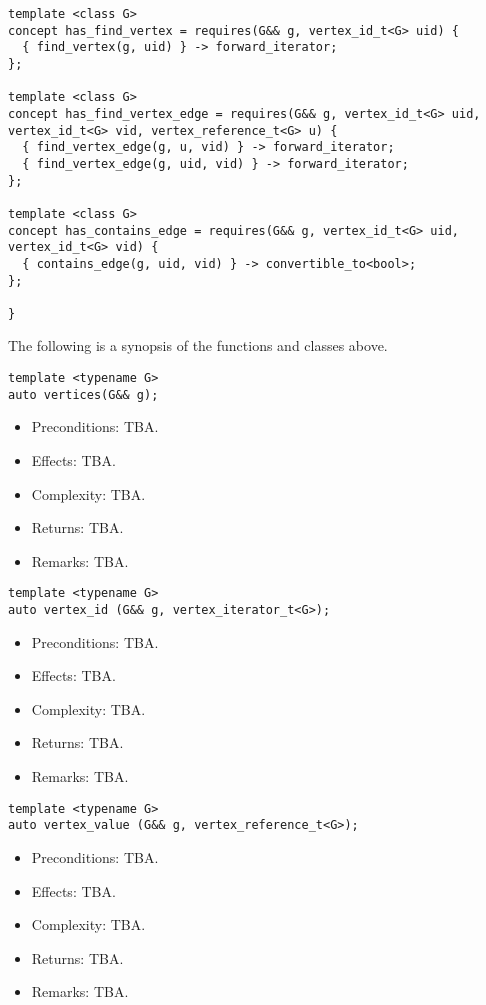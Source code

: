 \documentclass[10pt,onecolumn]{article}
\begin{document}
\begin{lstlisting}
template <class G>
concept has_find_vertex = requires(G&& g, vertex_id_t<G> uid) {
  { find_vertex(g, uid) } -> forward_iterator;
};

template <class G>
concept has_find_vertex_edge = requires(G&& g, vertex_id_t<G> uid, vertex_id_t<G> vid, vertex_reference_t<G> u) {
  { find_vertex_edge(g, u, vid) } -> forward_iterator;
  { find_vertex_edge(g, uid, vid) } -> forward_iterator;
};

template <class G>
concept has_contains_edge = requires(G&& g, vertex_id_t<G> uid, vertex_id_t<G> vid) {
  { contains_edge(g, uid, vid) } -> convertible_to<bool>;
};

}
\end{lstlisting}

\vspace{10pt}

\noindent The following is a synopsis of the functions and classes above.

\begin{lstlisting}
template <typename G>
auto vertices(G&& g);
\end{lstlisting}
%
\begin{itemize}
\item Preconditions: TBA.
\item Effects: TBA.
\item Complexity: TBA.
\item Returns: TBA.
\item Remarks: TBA.
\end{itemize}

\vspace{10pt}

\begin{lstlisting}
template <typename G>
auto vertex_id (G&& g, vertex_iterator_t<G>);
\end{lstlisting}
%
\begin{itemize}
\item Preconditions: TBA.
\item Effects: TBA.
\item Complexity: TBA.
\item Returns: TBA.
\item Remarks: TBA.
\end{itemize}

\vspace{10pt}

\begin{lstlisting}
template <typename G>
auto vertex_value (G&& g, vertex_reference_t<G>);
\end{lstlisting}
%
\begin{itemize}
\item Preconditions: TBA.
\item Effects: TBA.
\item Complexity: TBA.
\item Returns: TBA.
\item Remarks: TBA.
\end{itemize}
\end{document}
